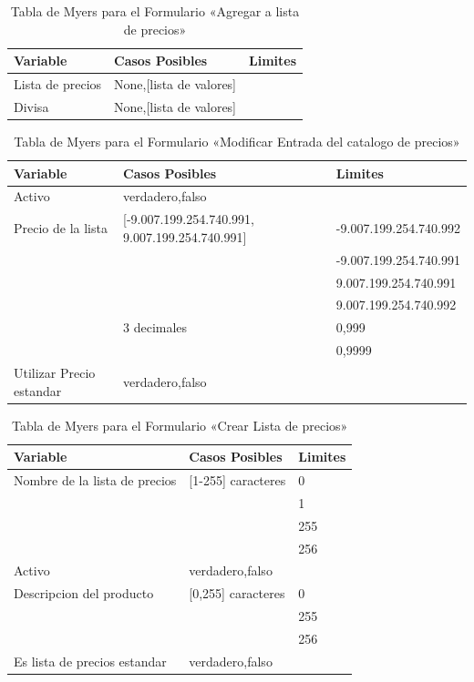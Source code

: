 \begin{table}
\centering
\begin{tabular}{|l|p{5.0cm}|l|}
\hline
\textbf{Variable} & \textbf{Casos Posibles} & \textbf{Limites} \\
\hline
Lista de precios & None,[lista de valores] & \\
\hline
Divisa & None,[lista de valores] & \\
\hline
\end{tabular}
\caption{Tabla de Myers para el Formulario «Agregar a lista de precios»}
\label{myers_03}
\end{table}

\begin{table}
\centering
\begin{tabular}{|l|p{5.0cm}|l|}
\hline
\textbf{Variable} & \textbf{Casos Posibles} & \textbf{Limites} \\
\hline
Activo  & {verdadero,falso} & \\
\hline
Precio de la lista & [-9.007.199.254.740.991, 9.007.199.254.740.991] & -9.007.199.254.740.992 \\
& & -9.007.199.254.740.991 \\
& & 9.007.199.254.740.991 \\
& & 9.007.199.254.740.992 \\
& 3 decimales & 0,999 \\
& & 0,9999 \\
\hline
Utilizar Precio estandar & {verdadero,falso} & \\
\hline
\end{tabular}
\caption{Tabla de Myers para el Formulario «Modificar Entrada del catalogo de precios»}
\label{myers_04}
\end{table}

\begin{table}
\centering
\begin{tabular}{|l|l|l|}
\hline
\textbf{Variable} & \textbf{Casos Posibles} & \textbf{Limites} \\
\hline
Nombre de la lista de precios & [1-255] caracteres & 0 \\
& & 1 \\
& & 255 \\
& & 256 \\
\hline
Activo  & {verdadero,falso} & \\
\hline
Descripcion del producto & [0,255] caracteres & 0 \\
& & 255 \\
& & 256 \\
\hline
Es lista de precios estandar & {verdadero,falso} & \\
\hline
\end{tabular}
\caption{Tabla de Myers para el Formulario «Crear Lista de precios»}
\label{myers_05}
\end{table}


